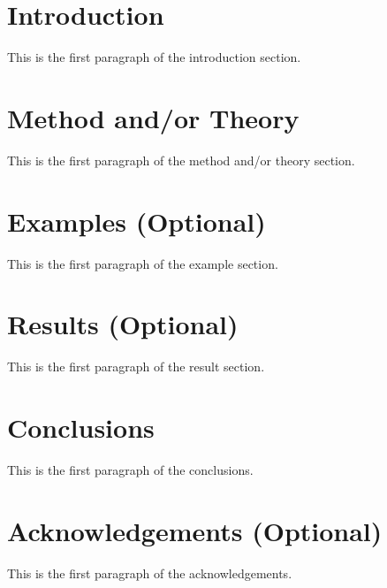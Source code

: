 \documentclass{london13}
\begin{document}
\section{Introduction}

This is the first paragraph of the introduction section.

\section{Method and/or Theory}

This is the first paragraph of the method and/or theory section.

\section{Examples (Optional)}

This is the first paragraph of the example section.

\section{Results (Optional)}

This is the first paragraph of the result section.

\section{Conclusions}

This is the first paragraph of the conclusions.

\section{Acknowledgements (Optional)}

This is the first paragraph of the acknowledgements.

%
%
% 
\end{document}
